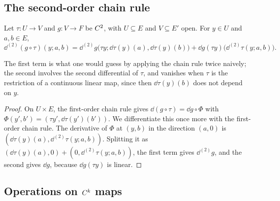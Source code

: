 \subsection{The second-order chain rule}

\begin{theorem}
  \label{thm:chain-second}
  \leanok
  Let $\tau \colon U \to V$ and $g \colon V \to F$ be $C^{2}$, with $U \subseteq E$ and
  $V \subseteq E'$ open. For $y \in U$ and $a, b \in E$,
  \[
    \dd^{(2)} (g \circ \tau)(y; a, b)
      = \dd^{(2)} g\bigl(\tau y; \dd\tau(y)(a), \dd\tau(y)(b)\bigr)
        + \dd g(\tau y)\bigl(\dd^{(2)} \tau(y; a, b)\bigr).
  \]
\end{theorem}

The first term is what one would guess by applying the chain rule twice naively; the second
involves the second differential of $\tau$, and vanishes when $\tau$ is the restriction of a continuous
linear map, since then $\dd\tau(y)(b)$ does not depend on $y$.

\begin{proof}
  \leanok
  On $U \times E$, the first-order chain rule gives $\dd(g \circ \tau) = \dd g \circ \Phi$ with
  $\Phi(y', b') = (\tau y', \dd\tau(y')(b'))$. We differentiate this once more with the
  first-order chain rule. The derivative of $\Phi$ at $(y, b)$ in the direction $(a, 0)$ is
  $(\dd\tau(y)(a), \dd^{(2)}\tau(y; a, b))$. Splitting it as
  $(\dd\tau(y)(a), 0) + (0, \dd^{(2)}\tau(y; a, b))$, the first term gives $\dd^{(2)} g$, and
  the second gives $\dd g$, because $\dd g(\tau y)$ is linear.
\end{proof}

\subsection{Operations on \texorpdfstring{$C^{k}$}{Ck} maps}


